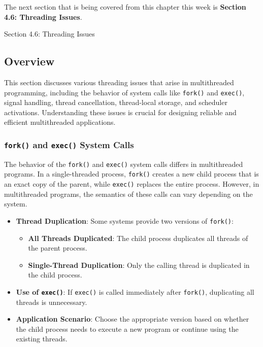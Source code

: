 The next section that is being covered from this chapter this week is \textbf{Section 4.6: Threading Issues}.

\begin{notes}{Section 4.6: Threading Issues}
    \subsection*{Overview}

    This section discusses various threading issues that arise in multithreaded programming, including the behavior of system calls like \texttt{fork()} and \texttt{exec()}, signal handling, thread 
    cancellation, thread-local storage, and scheduler activations. Understanding these issues is crucial for designing reliable and efficient multithreaded applications.
    
    \subsubsection*{\texttt{fork()} and \texttt{exec()} System Calls}
    
    The behavior of the \texttt{fork()} and \texttt{exec()} system calls differs in multithreaded programs. In a single-threaded process, \texttt{fork()} creates a new child process that is an exact 
    copy of the parent, while \texttt{exec()} replaces the entire process. However, in multithreaded programs, the semantics of these calls can vary depending on the system.
    
    \begin{highlight}
    
        \begin{itemize}
            \item \textbf{Thread Duplication}: Some systems provide two versions of \texttt{fork()}:
                \begin{itemize}
                    \item \textbf{All Threads Duplicated}: The child process duplicates all threads of the parent process.
                    \item \textbf{Single-Thread Duplication}: Only the calling thread is duplicated in the child process.
                \end{itemize}
            \item \textbf{Use of \texttt{exec()}}: If \texttt{exec()} is called immediately after \texttt{fork()}, duplicating all threads is unnecessary.
            \item \textbf{Application Scenario}: Choose the appropriate version based on whether the child process needs to execute a new program or continue using the existing threads.
        \end{itemize}
    

\end{highlight}
\end{notes}
